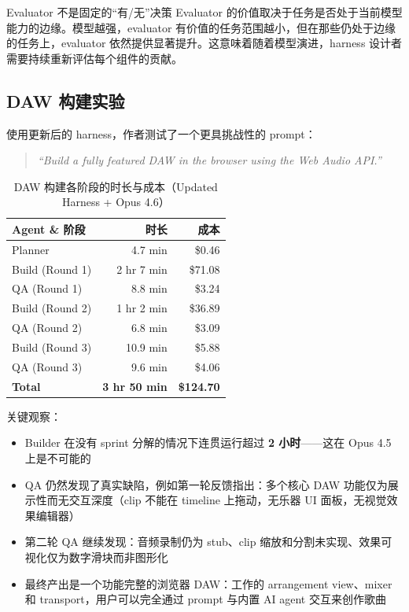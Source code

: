\documentclass[a4paper]{article}
\begin{document}
\begin{warningbox}{Evaluator 不是固定的``有/无''决策}
Evaluator 的价值取决于任务是否处于当前模型能力的边缘。模型越强，evaluator 有价值的任务范围越小，但在那些仍处于边缘的任务上，evaluator 依然提供显著提升。这意味着随着模型演进，harness 设计者需要持续重新评估每个组件的贡献。
\end{warningbox}

\subsection{DAW 构建实验}

使用更新后的 harness，作者测试了一个更具挑战性的 prompt：

\begin{quote}
\textit{``Build a fully featured DAW in the browser using the Web Audio API.''}
\end{quote}

\begin{table}[H]
\centering
\begin{tabular}{lrr}
\toprule
\textbf{Agent \& 阶段} & \textbf{时长} & \textbf{成本} \\
\midrule
Planner & 4.7 min & \$0.46 \\
Build (Round 1) & 2 hr 7 min & \$71.08 \\
QA (Round 1) & 8.8 min & \$3.24 \\
Build (Round 2) & 1 hr 2 min & \$36.89 \\
QA (Round 2) & 6.8 min & \$3.09 \\
Build (Round 3) & 10.9 min & \$5.88 \\
QA (Round 3) & 9.6 min & \$4.06 \\
\midrule
\textbf{Total} & \textbf{3 hr 50 min} & \textbf{\$124.70} \\
\bottomrule
\end{tabular}
\caption{DAW 构建各阶段的时长与成本（Updated Harness + Opus 4.6）}
\end{table}

关键观察：

\begin{itemize}
    \item Builder 在没有 sprint 分解的情况下连贯运行超过 \textbf{2 小时}——这在 Opus 4.5 上是不可能的
    \item QA 仍然发现了真实缺陷，例如第一轮反馈指出：多个核心 DAW 功能仅为展示性而无交互深度（clip 不能在 timeline 上拖动，无乐器 UI 面板，无视觉效果编辑器）
    \item 第二轮 QA 继续发现：音频录制仍为 stub、clip 缩放和分割未实现、效果可视化仅为数字滑块而非图形化
    \item 最终产出是一个功能完整的浏览器 DAW：工作的 arrangement view、mixer 和 transport，用户可以完全通过 prompt 与内置 AI agent 交互来创作歌曲
\end{itemize}
\end{document}
